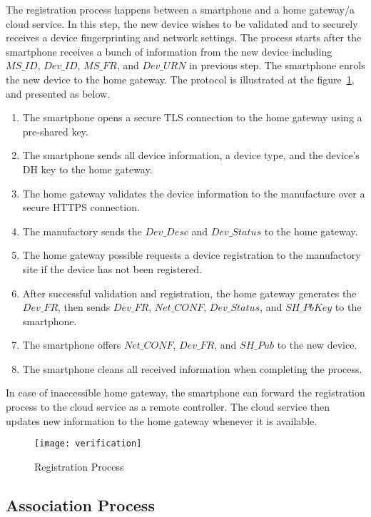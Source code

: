 The registration process happens between a smartphone and a home gateway/a cloud service. In this step, the new device wishes to be validated and to securely receives a device fingerprinting and network settings. The process starts after the smartphone receives a bunch of information from the new device including $MS\_ID$, $Dev\_ID$, $MS\_FR$, and $Dev\_URN$ in previous step. The smartphone enrols the new device to the home gateway. The protocol is illustrated at the figure~\ref{registration}, and presented as below.
\begin{enumerate}
\item The smartphone opens a secure TLS connection to the home gateway using a pre-shared key.
\item The smartphone sends all device information, a device type, and the device's DH key to the home gateway. 
\item The home gateway validates the device information to the manufacture  over a secure HTTPS connection. 
\item The manufactory sends the $Dev\_Desc$ and $Dev\_Status$ to the home gateway.
\item The home gateway possible requests a device registration to the manufactory site if the device has not been registered. 
\item After successful validation and registration, the home gateway generates the $Dev\_FR$, then sends $Dev\_FR$, $Net\_CONF$, $Dev\_Status$, and $SH\_PbKey$ to the smartphone. 
\item The smartphone offers $Net\_CONF$, $Dev\_FR$, and $SH\_Pub$ to the new device.
\item The smartphone cleans all received information when completing the process. 
\end{enumerate}

In case of inaccessible home gateway, the smartphone can forward the registration process to the cloud service as a remote controller. The cloud service then updates new information to the home gateway whenever it is available. 
\begin{figure}
  \centering
  \texttt{[image: verification]}
  \caption{Registration Process}
  \label{registration}
\end{figure}

\subsection{Association Process}

